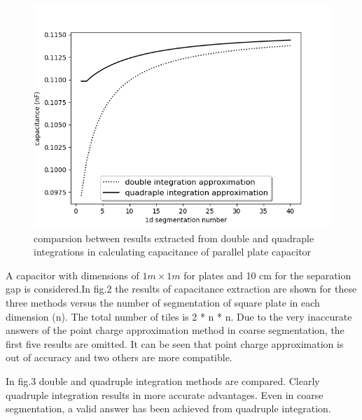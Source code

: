 \documentclass[final,5p,times,twocolumn]{elsarticle}
\begin{document}
\begin {figure}[h]
	\center
	\includegraphics[width=\linewidth]	{saeedvshitoshi.png}
	\caption{comparsion between results extracted from double and quadraple integrations in calculating capacitance of parallel plate capacitor}
\end{figure}
A capacitor with dimensions of $1m \times 1m $ for plates and 10 cm for the separation gap is considered.In fig.2 the results of capacitance extraction are shown for these three methods versus the number of segmentation of square plate in each dimension (n). The total number of tiles is 2 * n * n. Due to the very inaccurate answers of the point charge approximation method in coarse segmentation, the first five results are omitted. It can be seen that point charge approximation is out of accuracy and two others are more compatible. 


In fig.3 double and quadruple integration methods are compared. Clearly quadruple integration results in more accurate advantages. Even in coarse segmentation, a valid answer has been achieved from quadruple integration.
\end{document}
